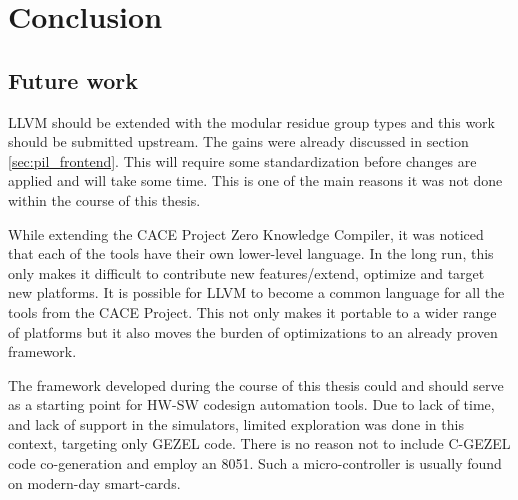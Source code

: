 \chapter{Conclusion}

\section{Future work}

LLVM should be extended with the modular residue group types and this
work should be submitted upstream. The gains were already discussed in
section \ref{sec:pil_frontend}. This will require some standardization
before changes are applied and will take some time. This is one of the
main reasons it was not done within the course of this thesis.

While extending the CACE Project Zero Knowledge Compiler, it was
noticed that each of the tools have their own lower-level language. In
the long run, this only makes it difficult to contribute new
features/extend, optimize and target new platforms. It is possible for
LLVM to become a common language for all the tools from the CACE
Project. This not only makes it portable to a wider range of platforms
but it also moves the burden of optimizations to an already proven
framework.

The framework developed during the course of this thesis could and
should serve as a starting point for HW-SW codesign automation tools.
Due to lack of time, and lack of support in the simulators, limited
exploration was done in this context, targeting only GEZEL code. There
is no reason not to include C-GEZEL code co-generation and employ an
8051. Such a micro-controller is usually found on modern-day
smart-cards.

